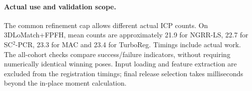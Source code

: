 \paragraph{Actual use and validation scope.} The common refinement cap allows different actual ICP counts. On 3DLoMatch+FPFH, mean counts are approximately 21.9 for NGRR-LS, 22.7 for SC$^2$-PCR, 23.3 for MAC and 23.4 for TurboReg. Timings include actual work. The all-cohort checks compare success/failure indicators, without requiring numerically identical winning poses. Input loading and feature extraction are excluded from the registration timings; final release selection takes milliseconds beyond the in-place moment calculation.
